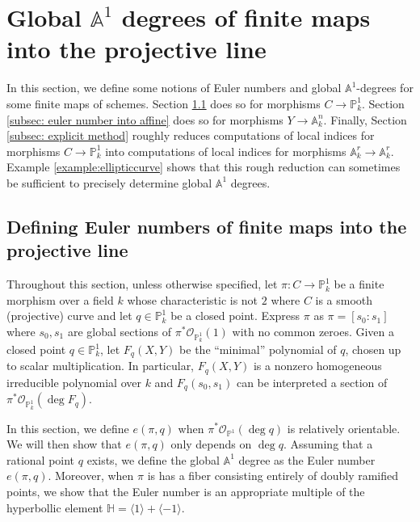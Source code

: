 \documentclass[12pt, reqno]{amsart}
\theoremstyle{definition}
\newcommand{\A}{\mathbb{A}} %
\newcommand{\Proj}{\mathbb{P}} %
\newcommand{\Oh}{\mathscr{O}} %
\begin{document}
\section{Global $\A^1$ degrees of finite maps into the projective line}
\label{sec: Global A1 degrees}

In this section, we define some notions of Euler numbers and global $\A^1$-degrees for some finite maps of schemes. Section \ref{sec: Relative orientability} does so for morphisms $C \rightarrow \Proj^1_k$. Section \ref{subsec: euler number into affine} does so for morphisms $Y \rightarrow \A^n_k$. Finally, Section \ref{subsec: explicit method} roughly reduces computations of local indices for morphisms $C \rightarrow \Proj^1_k$ into computations of local indices for morphisms $\A^r_k \rightarrow \A^r_k$. Example \ref{example:ellipticcurve} shows that this rough reduction can sometimes be sufficient to precisely determine global $\A^1$ degrees.

\subsection{Defining Euler numbers of finite maps into the projective line}\label{sec: Relative orientability}

Throughout this section, unless otherwise specified, let $\pi: C \rightarrow \Proj^1_k$ be a finite morphism over a field $k$ whose characteristic is not $2$ where $C$ is a smooth (projective) curve and let $q \in \Proj^1_k$ be a closed point. Express $\pi$ as $\pi = [s_0:s_1]$ where $s_0,s_1$ are global sections of $\pi^* \mathscr{O}_{\Proj^1_k}(1)$ with no common zeroes. Given a closed point $q \in \Proj^1_k$, let $F_q(X,Y)$ be the ``minimal'' polynomial of $q$, chosen up to scalar multiplication. In particular, $F_q(X,Y)$  is a nonzero homogeneous irreducible polynomial over $k$ and $F_q(s_0,s_1)$ can be interpreted a section of $\pi^* \mathscr{O}_{\Proj^1_k}(\deg F_q)$.

In this section, we define $e(\pi, q)$ when $\pi^* \Oh_{\Proj^1}(\deg q)$ is relatively orientable. We will then show that $e(\pi, q)$ only depends on $\deg q$. Assuming that a rational point $q$ exists, we define the global $\A^1$ degree as the Euler number $e(\pi, q)$. Moreover, when $\pi$ is has a fiber consisting entirely of doubly ramified points, we show that the Euler number is an appropriate multiple of the hyperbollic element $\mathbb{H} = \langle 1 \rangle + \langle -1 \rangle$. \par
\end{document}

